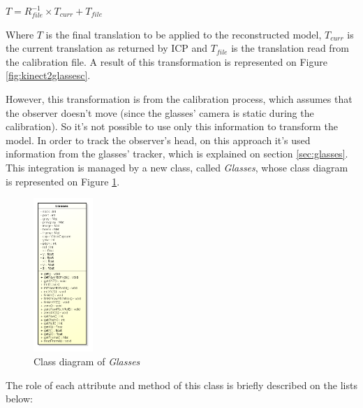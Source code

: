 \documentclass[msc, a4paper, classic, en]{ufbathesis}
\begin{document}
\begin{center}
$T = R_{file}^{-1} \times T_{curr} + T_{file}$
\end{center}

Where $T$ is the final translation to be applied to the reconstructed model, $T_{curr}$ is the current translation as returned by ICP and $T_{file}$ is the translation read from the calibration file. A result of this transformation is represented on Figure \ref{fig:kinect2glassesc}.

However, this transformation is from the calibration process, which assumes that the observer doesn't move (since the glasses' camera is static during the calibration). So it's not possible to use only this information to transform the model. In order to track the observer's head, on this approach it's used information from the glasses' tracker, which is explained on section \ref{sec:glasses}. This integration is managed by a new class, called \textit{Glasses}, whose class diagram is represented on Figure \ref{fig:glassesclassdiagram}.

\begin{figure}
\centering
\includegraphics[width=0.2\textwidth]{images/glasses.png}
\caption{Class diagram of \textit{Glasses}}
\label{fig:glassesclassdiagram}
\end{figure}

The role of each attribute and method of this class is briefly described on the lists below:
\end{document}

